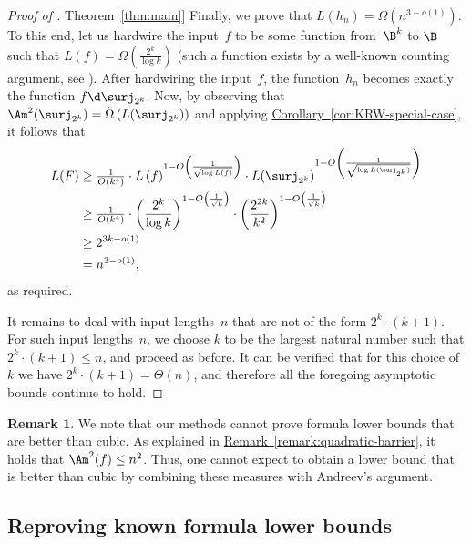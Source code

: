 \documentclass[11pt]{article}
\numberwithin{equation}{section}
\theoremstyle{definition}
\newtheorem{remark}[theorem]{Remark}
\theoremstyle{plain}
\newcommand{\expref}[2]{\hyperref[#2]{#1~\ref{#2}}}
\theoremstyle{definition}\newtheorem{notation}[theorem]{Notation}\theoremstyle{plain}
\begin{document}
\begin{proof}[Proof of \expref{Theorem}{thm:main}]
Finally, we prove that $L(h_{n})=\Omega(n^{3-o(1)})$. To this end,
let us hardwire the input~$f$ to be some function from~$\B^{k}$
to $\B$ such that $L(f)=\Omega(\frac{2^{k}}{\log k})$ (such a function
exists by a well-known counting argument, see \cite[Theorem 1.23]{JuknaBook}).
After hardwiring the input~$f$, the function~$h_{n}$ becomes exactly
the function $f\d\surj_{2^{k}}$. Now, by observing that $\Am^{2}(\surj_{2^{k}})=\tilde{\Omega}\left(L(\surj_{2^{k}})\right)$
and applying \expref{Corollary}{cor:KRW-special-case}, it follows that 
\begin{align*}
L(F) & \ge\tfrac{1}{O(k^{4})}\cdot L\left(f\right)^{1-O\left(\frac{1}{\sqrt{\log L(f)}}\right)}\cdot L(\surj_{2^{k}})^{1-O\left(\frac{1}{\sqrt{\log L(\surj_{2^{k}})}}\right)}\\
 & \ge\tfrac{1}{O(k^{4})}\cdot\left(\frac{2^{k}}{\log k}\right)^{1-O\left(\frac{1}{\sqrt{k}}\right)}\cdot\left(\frac{2^{2k}}{k^{2}}\right)^{1-O\left(\frac{1}{\sqrt{k}}\right)}\\
 & \ge2^{3k-o(1)}\\
 & =n^{3-o(1)},
\end{align*}
as required.

It remains to deal with input lengths~$n$ that are not of the form
$2^{k}\cdot(k+1)$. For such input lengths~$n$, we choose $k$ to
be the largest natural number such that $2^{k}\cdot(k+1)\le n$, and
proceed as before. It can be verified that for this choice of~$k$
we have $2^{k}\cdot(k+1)=\Theta(n)$, and therefore all the
foregoing asymptotic bounds continue to hold. 
\end{proof}
\begin{remark}
We note that our methods cannot prove formula lower bounds that are
better than cubic. As explained in \expref{Remark}{remark:quadratic-barrier}, 
it holds
that %
$\Am^2(f) \le n^{2}$.   %
Thus, one cannot expect
to obtain a lower bound that is better than cubic by combining these
measures with Andreev's argument. 
\end{remark}


\subsection{\label{subsec:known-results}Reproving known formula lower bounds}
\end{document}
